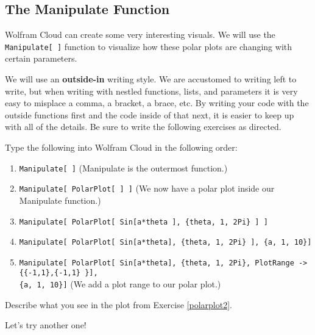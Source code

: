 \vspace{2in}

\subsection{The Manipulate Function}
Wolfram Cloud can create some very interesting visuals. We will use the \lstinline$Manipulate[ ]$ function to visualize how these polar plots are changing with certain parameters.

\noindent We will use an \textbf{outside-in} writing style. We are accustomed to writing left to write, but when writing with nestled functions, lists, and parameters it is very easy to misplace a comma, a bracket, a brace, etc. By writing your code with the outside functions first and the code inside of that next, it is easier to keep up with all of the details. Be sure to write the following exercises as directed.

\begin{exercise}\label{polarplot2}
Type the following into Wolfram Cloud in the following order:
\begin{enumerate}
    \item \lstinline$Manipulate[ ]$ (Manipulate is the outermost function.)
    \item \lstinline$Manipulate[ PolarPlot[ ] ]$ (We now have a polar plot inside our Manipulate function.)
    \item \lstinline$Manipulate[ PolarPlot[ Sin[a*theta ], {theta, 1, 2Pi} ] ]$
    \item \lstinline$Manipulate[ PolarPlot[ Sin[a*theta], {theta, 1, 2Pi} ], {a, 1, 10}]$
    \item \lstinline$Manipulate[ PolarPlot[ Sin[a*theta], {theta, 1, 2Pi}, PlotRange -> {{-1,1},{-1,1} }],$ \\ \lstinline${a, 1, 10}]$ (We add a plot range to our polar plot.)
\end{enumerate}
\end{exercise}

\begin{exercise}
Describe what you see in the plot from Exercise \ref{polarplot2}.
\end{exercise}

\blanks
\blanks

\noindent Let's try another one!

